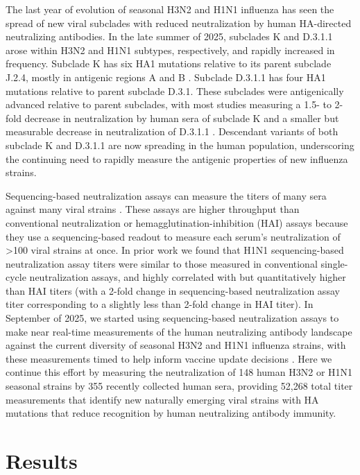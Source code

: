 The last year of evolution of seasonal H3N2 and H1N1 influenza has seen the spread of new viral subclades with reduced neutralization by human HA-directed neutralizing antibodies. In the late summer of 2025, subclades K and D.3.1.1 arose within H3N2 and H1N1 subtypes, respectively, and rapidly increased in frequency. Subclade K has six HA1 mutations relative to its parent subclade J.2.4, mostly in antigenic regions A and B \citep{liu2026b}. Subclade D.3.1.1 has four HA1 mutations relative to parent subclade D.3.1. These subclades were antigenically advanced relative to parent subclades, with most studies measuring a 1.5- to 2-fold decrease in neutralization by human sera of subclade K \citep{kikawa2026a,kirsebom2025,cheng2026,dee2026,ikonen2026,separovic2026,wang2026,liu2026b} and a smaller but measurable decrease in neutralization of D.3.1.1 \citep{kikawa2026a}. Descendant variants of both subclade K and D.3.1.1 are now spreading in the human population, underscoring the continuing need to rapidly measure the antigenic properties of new influenza strains.

Sequencing-based neutralization assays can measure the titers of many sera against many viral strains \citep{kikawa2026b,loes2024}. These assays are higher throughput than conventional neutralization or hemagglutination-inhibition (HAI) assays because they use a sequencing-based readout to measure each serum's neutralization of \textgreater100 viral strains at once. In prior work \citep{loes2024} we found that H1N1 sequencing-based neutralization assay titers were similar to those measured in conventional single-cycle neutralization assays, and highly correlated with but quantitatively higher than HAI titers (with a 2-fold change in sequencing-based neutralization assay titer corresponding to a slightly less than 2-fold change in HAI titer). In September of 2025, we started using sequencing-based neutralization assays to make near real-time measurements of the human neutralizing antibody landscape against the current diversity of seasonal H3N2 and H1N1 influenza strains, with these measurements timed to help inform vaccine update decisions \citep{kikawa2025,kikawa2026a}. Here we continue this effort by measuring the neutralization of 148 human H3N2 or H1N1 seasonal strains by 355 recently collected human sera, providing 52,268 total titer measurements that identify new naturally emerging viral strains with HA mutations that reduce recognition by human neutralizing antibody immunity.

\section{Results}

